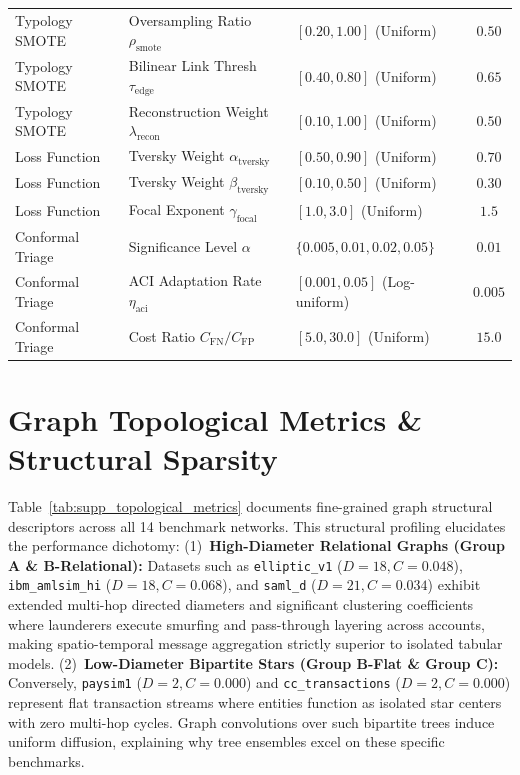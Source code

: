 \documentclass[a4paper,fleqn,twocolumn]{article}
\begin{document}
\begin{table}[htbp]
{\begin{tabular}{lllc}
Typology SMOTE & Oversampling Ratio $\rho_{\text{smote}}$ & $[0.20, 1.00]$ (Uniform) & $0.50$ \\
Typology SMOTE & Bilinear Link Thresh $\tau_{\text{edge}}$ & $[0.40, 0.80]$ (Uniform) & $0.65$ \\
Typology SMOTE & Reconstruction Weight $\lambda_{\text{recon}}$ & $[0.10, 1.00]$ (Uniform) & $0.50$ \\
\midrule
Loss Function & Tversky Weight $\alpha_{\text{tversky}}$ & $[0.50, 0.90]$ (Uniform) & $0.70$ \\
Loss Function & Tversky Weight $\beta_{\text{tversky}}$ & $[0.10, 0.50]$ (Uniform) & $0.30$ \\
Loss Function & Focal Exponent $\gamma_{\text{focal}}$ & $[1.0, 3.0]$ (Uniform) & $1.5$ \\
\midrule
Conformal Triage & Significance Level $\alpha$ & $\{0.005, 0.01, 0.02, 0.05\}$ & $0.01$ \\
Conformal Triage & ACI Adaptation Rate $\eta_{\text{aci}}$ & $[0.001, 0.05]$ (Log-uniform) & $0.005$ \\
Conformal Triage & Cost Ratio $C_{\text{FN}} / C_{\text{FP}}$ & $[5.0, 30.0]$ (Uniform) & $15.0$ \\
\bottomrule
\end{tabular}%
}
\end{table}

\section{Graph Topological Metrics \& Structural Sparsity}
\label{sec:supp_graph_topologies}

Table~\ref{tab:supp_topological_metrics} documents fine-grained graph structural descriptors across all 14 benchmark networks. This structural profiling elucidates the performance dichotomy: (1)~\textbf{High-Diameter Relational Graphs (Group A \& B-Relational):} Datasets such as \texttt{elliptic\_v1} ($D=18, C=0.048$), \texttt{ibm\_amlsim\_hi} ($D=18, C=0.068$), and \texttt{saml\_d} ($D=21, C=0.034$) exhibit extended multi-hop directed diameters and significant clustering coefficients where launderers execute smurfing and pass-through layering across accounts, making spatio-temporal message aggregation strictly superior to isolated tabular models. (2)~\textbf{Low-Diameter Bipartite Stars (Group B-Flat \& Group C):} Conversely, \texttt{paysim1} ($D=2, C=0.000$) and \texttt{cc\_transactions} ($D=2, C=0.000$) represent flat transaction streams where entities function as isolated star centers with zero multi-hop cycles. Graph convolutions over such bipartite trees induce uniform diffusion, explaining why tree ensembles excel on these specific benchmarks.
\end{document}
